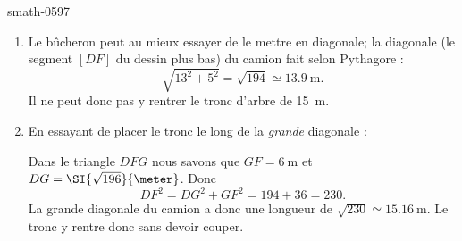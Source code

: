 
\begin{corrige}{smath-0597}

    \begin{enumerate}
        \item
            Le bûcheron peut au mieux essayer de le mettre en diagonale; la diagonale (le segment \( [DF]\) du dessin plus bas) du camion fait selon Pythagore :
            \begin{equation}
                \sqrt{13^2+5^2}=\sqrt{194}\simeq \SI{13.9}{\meter}.
            \end{equation}
            Il ne peut donc pas y rentrer le tronc d'arbre de \SI{15}{\meter}.
        \item
            En essayant de placer le tronc le long de la \emph{grande} diagonale :
            \begin{center}
   
            \end{center}
            Dans le triangle \( DFG\) nous savons que \( GF=\SI{6}{\meter}\) et \( DG=\SI{\sqrt{196}}{\meter}\). Donc
            \begin{equation}
                DF^2=DG^2+GF^2=194+36=230.
            \end{equation}
            La grande diagonale du camion a donc une longueur de \( \sqrt{230}\simeq\SI{15.16}{\meter}\). Le tronc y rentre donc sans devoir couper.
    \end{enumerate}

\end{corrige}
